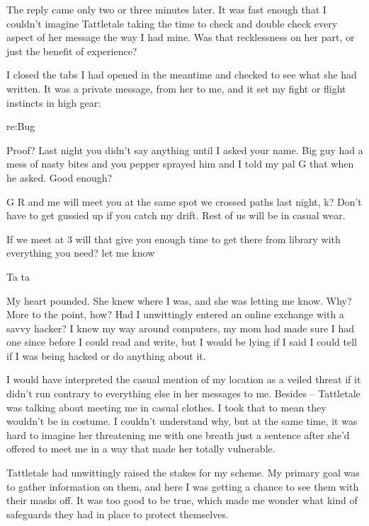 The reply came only two or three minutes later.  It was fast enough that I couldn't imagine Tattletale taking the time to check and double check every aspect of her message the way I had mine.  Was that recklessness on her part, or just the benefit of experience?



I closed the tabs I had opened in the meantime and checked to see what she had written.  It was a private message, from her to me, and it set my fight or flight instincts in high gear:



re:Bug



Proof?  Last night you didn't say anything until I asked your name.  Big guy had a mess of nasty bites and you pepper sprayed him and I told my pal G that when he asked.  Good enough?



G R and me will meet you at the same spot we crossed paths last night, k? Don't have to get gussied up if you catch my drift. Rest of us will be in casual wear.



If we meet at 3 will that give you enough time to get there from library with everything you need?  let me know



Ta ta



My heart pounded.  She knew where I was, and she was letting me know.  Why?  More to the point, how?  Had I unwittingly entered an online exchange with a savvy hacker?  I knew my way around computers, my mom had made sure I had one since before I could read and write, but I would be lying if I said I could tell if I was being hacked or do anything about it.



I would have interpreted the casual mention of my location as a veiled threat if it didn't run contrary to everything else in her messages to me.  Besides – Tattletale was talking about meeting me in casual clothes.  I took that to mean they wouldn't be in costume.  I couldn't understand why, but at the same time, it was hard to imagine her threatening me with one breath just a sentence after she'd offered to meet me in a way that made her totally vulnerable.



Tattletale had unwittingly raised the stakes for my scheme.  My primary goal was to gather information on them, and here I was getting a chance to see them with their masks off.  It was too good to be true, which made me wonder what kind of safeguards they had in place to protect themselves.



